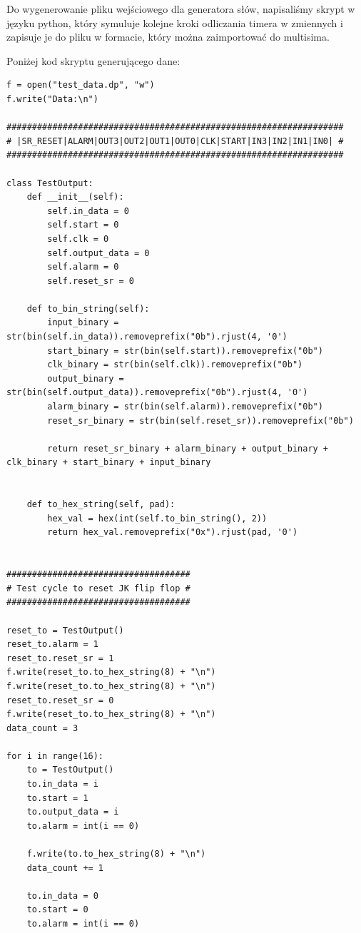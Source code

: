 \documentclass[a4paper]{article}
\begin{document}
Do wygenerowanie pliku wejściowego dla generatora słów, napisaliśmy skrypt w języku python, który 
symuluje kolejne kroki odliczania timera w zmiennych i zapisuje je do pliku w formacie, który można zaimportować 
do multisima.

Poniżej kod skryptu generującego dane:
\small
\begin{verbatim}
f = open("test_data.dp", "w")
f.write("Data:\n")

##################################################################
# |SR_RESET|ALARM|OUT3|OUT2|OUT1|OUT0|CLK|START|IN3|IN2|IN1|IN0| #
##################################################################

class TestOutput: 
    def __init__(self):
        self.in_data = 0
        self.start = 0
        self.clk = 0
        self.output_data = 0
        self.alarm = 0
        self.reset_sr = 0

    def to_bin_string(self):
        input_binary = str(bin(self.in_data)).removeprefix("0b").rjust(4, '0')
        start_binary = str(bin(self.start)).removeprefix("0b")
        clk_binary = str(bin(self.clk)).removeprefix("0b")
        output_binary = str(bin(self.output_data)).removeprefix("0b").rjust(4, '0')
        alarm_binary = str(bin(self.alarm)).removeprefix("0b")
        reset_sr_binary = str(bin(self.reset_sr)).removeprefix("0b")

        return reset_sr_binary + alarm_binary + output_binary + clk_binary + start_binary + input_binary
    

    def to_hex_string(self, pad):
        hex_val = hex(int(self.to_bin_string(), 2))
        return hex_val.removeprefix("0x").rjust(pad, '0')


####################################
# Test cycle to reset JK flip flop #
####################################

reset_to = TestOutput()
reset_to.alarm = 1
reset_to.reset_sr = 1
f.write(reset_to.to_hex_string(8) + "\n")
f.write(reset_to.to_hex_string(8) + "\n")
reset_to.reset_sr = 0
f.write(reset_to.to_hex_string(8) + "\n")
data_count = 3

for i in range(16):
    to = TestOutput()
    to.in_data = i
    to.start = 1
    to.output_data = i 
    to.alarm = int(i == 0)

    f.write(to.to_hex_string(8) + "\n")
    data_count += 1

    to.in_data = 0
    to.start = 0
    to.alarm = int(i == 0)


\end{verbatim}
\end{document}
